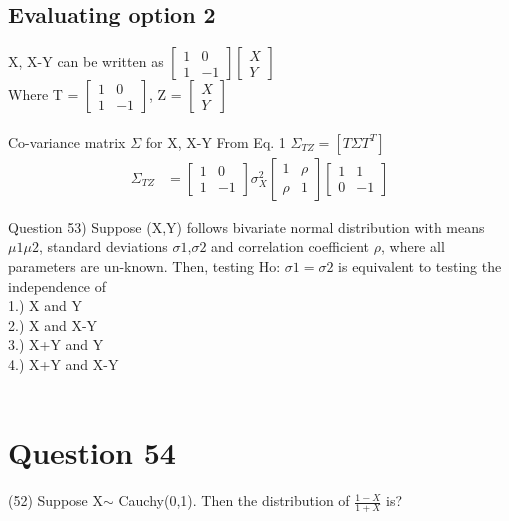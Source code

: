 \documentclass[journal,12pt,twocolumn]{IEEEtran}
\begin{document}
\begin{enumerate}[label=\arabic*.,ref=\theenumi]
\subsection{Evaluating option 2}
X, X-Y can be written as
$\begin{bmatrix}
   1   &   0\\
   1   &   -1
\end{bmatrix}
\begin{bmatrix}
   X \\
   Y
\end{bmatrix}$\\
Where T = $\begin{bmatrix}
   1   &   0\\
   1   &   -1
\end{bmatrix}$, Z = $\begin{bmatrix}
   X \\
   Y
\end{bmatrix}$\\
\\
Co-variance matrix $\Sigma$ for X, X-Y
From Eq. 1 $\Sigma_{TZ} = [T\Sigma T^T]$
\begin{align*}
    \Sigma_{TZ} &= \begin{bmatrix}
   1   &   0\\
   1   &   -1
\end{bmatrix} \sigma_X^2 
\begin{bmatrix}
   1    & \rho \\
   \rho &  1 
\end{bmatrix}
\begin{bmatrix}
   1   &   1\\
   0   &   -1
\end{bmatrix}
\end{align*}
\end{enumerate}
Question 53) Suppose (X,Y) follows bivariate normal distribution with means $\mu1  \mu2$, standard deviations $\sigma1$,$\sigma2$ and correlation coefficient $\rho$, where all parameters are un-known. Then, testing Ho: $\sigma1=\sigma2$ is equivalent to testing the independence of  
\\
1.) X and Y \\
2.) X and X-Y \\
3.) X+Y and Y \\
4.) X+Y and X-Y \\
\\
\section{Question 54}
(52) Suppose X$\sim$ Cauchy(0,1). Then the distribution of
$\frac{1-X}{1+X}$ is?
\end{document}
